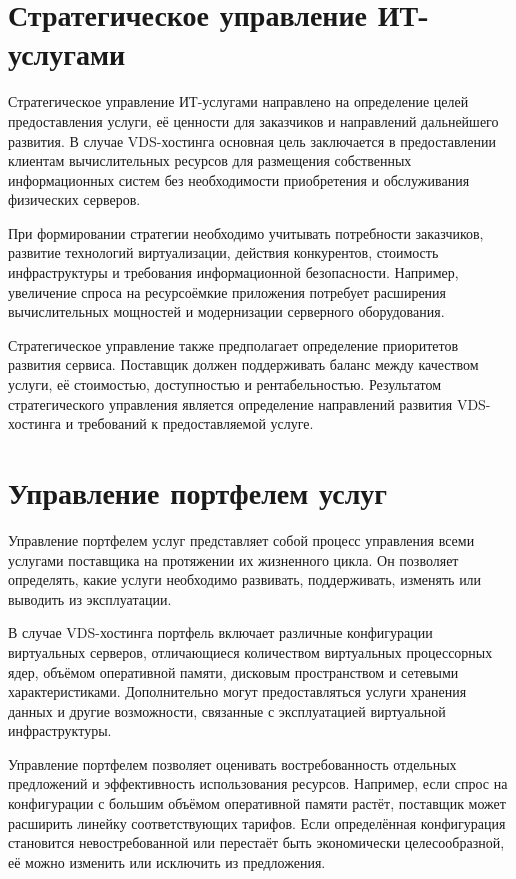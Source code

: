 \documentclass[14pt,a4paper]{extarticle}
\begin{document}
\section{Стратегическое управление ИТ-услугами}

Стратегическое управление ИТ-услугами направлено на определение целей предоставления услуги, её ценности для заказчиков и направлений дальнейшего развития. В случае VDS-хостинга основная цель заключается в предоставлении клиентам вычислительных ресурсов для размещения собственных информационных систем без необходимости приобретения и обслуживания физических серверов.

При формировании стратегии необходимо учитывать потребности заказчиков, развитие технологий виртуализации, действия конкурентов, стоимость инфраструктуры и требования информационной безопасности. Например, увеличение спроса на ресурсоёмкие приложения потребует расширения вычислительных мощностей и модернизации серверного оборудования.

Стратегическое управление также предполагает определение приоритетов развития сервиса. Поставщик должен поддерживать баланс между качеством услуги, её стоимостью, доступностью и рентабельностью. Результатом стратегического управления является определение направлений развития VDS-хостинга и требований к предоставляемой услуге.

\section{Управление портфелем услуг}

Управление портфелем услуг представляет собой процесс управления всеми услугами поставщика на протяжении их жизненного цикла. Он позволяет определять, какие услуги необходимо развивать, поддерживать, изменять или выводить из эксплуатации.

В случае VDS-хостинга портфель включает различные конфигурации виртуальных серверов, отличающиеся количеством виртуальных процессорных ядер, объёмом оперативной памяти, дисковым пространством и сетевыми характеристиками. Дополнительно могут предоставляться услуги хранения данных и другие возможности, связанные с эксплуатацией виртуальной инфраструктуры.

Управление портфелем позволяет оценивать востребованность отдельных предложений и эффективность использования ресурсов. Например, если спрос на конфигурации с большим объёмом оперативной памяти растёт, поставщик может расширить линейку соответствующих тарифов. Если определённая конфигурация становится невостребованной или перестаёт быть экономически целесообразной, её можно изменить или исключить из предложения.
\end{document}
